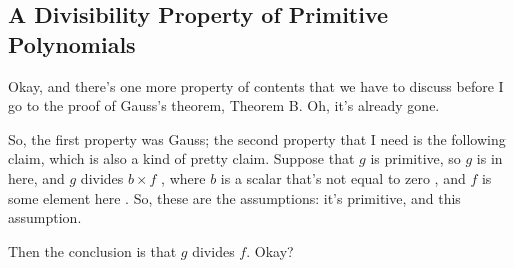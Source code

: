 \subsection{A Divisibility Property of Primitive Polynomials}

\begin{speech}[00:15:16 - 00:16:14]
Okay, and there's one more property of contents that we have to discuss before I go to the proof of Gauss's theorem, Theorem B. Oh, it's already gone.

So, the first property was Gauss; the second property that I need is the following claim, which is also a kind of pretty claim.  Suppose that $g$ is primitive, so $g$ is in here, and $g$ divides $b \times f$ , where $b$ is a scalar that's not equal to zero , and $f$ is some element here . So, these are the assumptions: it's primitive, and this assumption.

Then the conclusion is that $g$ divides $f$.  Okay?
\end{speech}

\begin{content}
\end{content}

